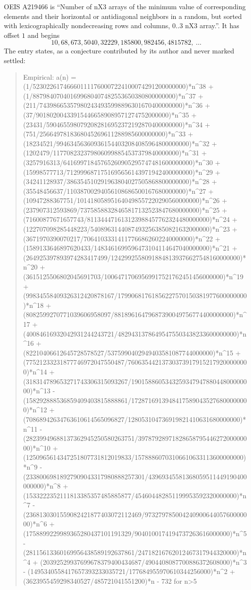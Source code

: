 \documentclass[11pt,a4paper]{article}
\theoremstyle{plain}
\theoremstyle{definition}
\begin{document}
OEIS A219466 is ``Number of nX3 arrays of the minimum value of corresponding elements and their horizontal or antidiagonal neighbors in a random, but sorted with lexicographically nondecreasing rows and columns, 0..3 nX3 array.''. It has offset $1$ and begins
\[
10, 68, 673, 5040, 32229, 185800, 982456, 4815782,\ \dots
\]
The entry states, as a conjecture contributed by its author and never marked settled:
\begin{quote}\raggedright\small
Empirical: a(n) = (1/523022617466601111760007224100074291200000000)*n\^{}38 + (1/887984070401699680407482553650380800000000)*n\^{}37 + (211/743986653579802434935998896301670400000000)*n\^{}36 + (37/901802004339154466589089571274752000000)*n\^{}35 + (23431/5904655980792082816952372192870400000000)*n\^{}34 + (751/2566497818368045269611288985600000000)*n\^{}33 + (18234521/994634563609361544032084085964800000000)*n\^{}32 + (1202479/1177082323798060998854537379840000000)*n\^{}31 + (3257916313/64169971845765260905295747481600000000)*n\^{}30 + (15998577713/7129996871751695656143971942400000000)*n\^{}29 + (34241128937/386354510291963804027505868800000000)*n\^{}28 + (35548456637/11038700294056108686500167680000000)*n\^{}27 + (10947288367751/101418058951640498557220290560000000)*n\^{}26 + (237907312593869/73758588328465817132523847680000000)*n\^{}25 + (71600877671657743/811344471613123988457762324480000000)*n\^{}24 + (122707098285448223/54089631440874932563850821632000000)*n\^{}23 + (3671970390070217/70641033314117766862602240000000)*n\^{}22 + (1589133646897620433/1483461699596473104114647040000000)*n\^{}21 + (264925397893974283417499/12429925580918848139376627548160000000)*n\^{}20 + (3615125506802045691703/10064717069569917521762451456000000)*n\^{}19 + (99834558409326312420878167/17990681761856227570150381977600000000)*n\^{}18 + (8082599270771039606958097/88189616479687390049756774400000000)*n\^{}17 + (40084616932042931244243721/48294313786495475503438233600000000)*n\^{}16 + (82210406612645728578527/5375990402949403581087744000000)*n\^{}15 + (77521233231877746972047550487/760635442137303739179152179200000000)*n\^{}14 + (318314789653271743306315093267/190158860534325934794788044800000000)*n\^{}13 - (158292888536859409403815888861/17287169139484175890435276800000000)*n\^{}12 + (70868942634763610614565096827/128053104736919821410631680000000)*n\^{}11 - (28239949688137362945250580263751/3978792897182865879544627200000000)*n\^{}10 + (1250965614347251807731812019833/15788860703106610633113600000000)*n\^{}9 - (23380069818927909043317980888257301/43969345581368059511449190400000000)*n\^{}8 + (1533222352111813385357485885877/454604482851199953592320000000)*n\^{}7 - (2368130301559082421877403072112469/97327978500424090064405760000000)*n\^{}6 + (1758899229989365280437101191329/9040100174194737263616000000)*n\^{}5 - (28115613360169956438589192637861/24718216762012467317944320000)*n\^{}4 + (20392529937699678379400434687/4904408087700886372608000)*n\^{}3 - (1495340558417657393233035721/177684955970610344256000)*n\^{}2 + (3623955459298340527/485721041551200)*n - 732 for n>5
\end{quote}
\end{document}
